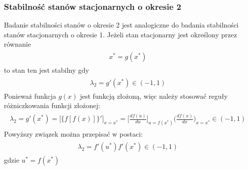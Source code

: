 \documentclass[a4paper,12pt,polish]{sphinxmanual}
\begin{document}
\subsubsection{Stabilność stanów stacjonarnych o okresie 2}
\label{ch1/chI031:stabilnosc-stanow-stacjonarnych-o-okresie-2}
Badanie stabilności stanów o okresie 2 jest analogiczne do badania stabilności stanów stacjonarnych o okresie 1. Jeżeli stan stacjonarny jest określony przez równanie
\label{ch1/chI031:equation-eqn33}\begin{gather}
\begin{split}x^*=g(x^*)\end{split}\label{ch1/chI031-eqn33}
\end{gather}
to  stan ten jest  stabilny gdy
\label{ch1/chI031:equation-eqn34}\begin{gather}
\begin{split}\lambda_2 = g'(x^*) \in (-1, 1)\end{split}\label{ch1/chI031-eqn34}
\end{gather}
Ponieważ funkcja $g(x)$ jest funkcją złożoną, więc  należy stosować reguły różniczkowania  funkcji złożonej:
\label{ch1/chI031:equation-eqn35}\begin{gather}
\begin{split}  \lambda_2 = g'(x^*)  =  \bigl[\{f[f(x)]\}' \bigr]_{x=x^*} =\biggl[ \frac{df(u)}{du}\biggr]_{u=f(x^*)} \biggl(\frac{df(x)}{dx}\biggr)_{x=x^*}  \in (-1, 1)\end{split}\label{ch1/chI031-eqn35}
\end{gather}
Powyższy związek można przepisać  w postaci:
\label{ch1/chI031:equation-eqn36}\begin{gather}
\begin{split}  \lambda_2 = f'(u^*) f'(x^*) \in (-1, 1)\end{split}\label{ch1/chI031-eqn36}
\end{gather}
gdzie $u^*=f(x^*)$
\end{document}
